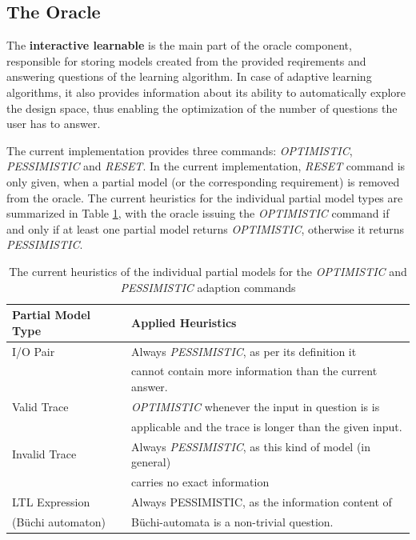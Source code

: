 \subsection{The Oracle} \label{subsec_oracleimpl}
The \textbf{interactive learnable} is the main part of the oracle component, responsible for storing models created from the provided reqirements and answering questions of the learning algorithm. In case of adaptive learning algorithms, it also provides information about its ability to automatically explore the design space, thus enabling the optimization of the number of questions the user has to answer. 

The current implementation provides three commands: \textit{OPTIMISTIC}, \textit{PESSIMISTIC} and \textit{RESET}. In the current implementation, \textit{RESET} command is only given, when a partial model (or the corresponding requirement) is removed from the oracle. The current heuristics for the individual partial model types are summarized in Table \ref{tab_implementedheuristics}, with the oracle issuing the \textit{OPTIMISTIC} command if and only if at least one partial model returns \textit{OPTIMISTIC}, otherwise it returns \textit{PESSIMISTIC}.

\begin{table}[ht]
	\footnotesize
	\centering
	\begin{tabular}{ l l }
		\toprule
		Partial Model Type & Applied Heuristics \\
		\midrule
		I/O Pair & Always \textit{PESSIMISTIC}, as per its definition it \\ &  cannot contain more information than the current answer. \\
		Valid Trace & \textit{OPTIMISTIC} whenever the input in question is is \\ & applicable and the trace is longer than the given input.  \\
		Invalid Trace & Always \textit{PESSIMISTIC}, as this kind of model (in general) \\ & carries no exact information \\
		LTL Expression  & Always PESSIMISTIC, as the information content of \\(Büchi automaton) & Büchi-automata is a non-trivial question. \\
		\bottomrule
	\end{tabular}
	\caption{The current heuristics of the individual partial models for the \textit{OPTIMISTIC} and \textit{PESSIMISTIC} adaption commands}
	\label{tab_implementedheuristics}
\end{table}

